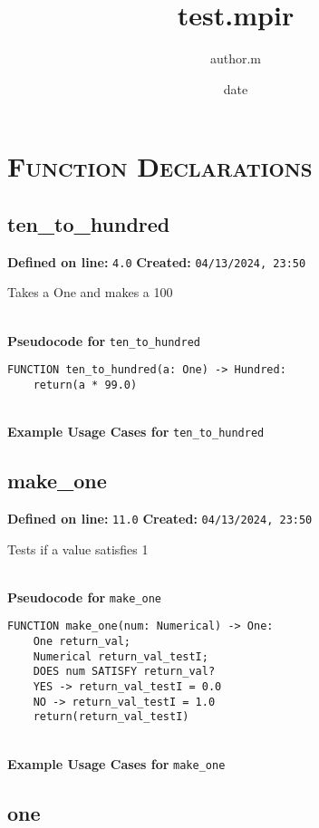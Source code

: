 \documentclass{article}
\title{test.mpir}
\author{author.m}
\date{date}
\begin{document}
\maketitle
\clearpage
\tableofcontents
\clearpage

\section{\textsc{Function Declarations}}

\subsection{ten\_to\_hundred}

\textbf{Defined on line:} \verb|4.0| \hfill \textbf{Created:} \verb|04/13/2024, 23:50| 


Takes a One and makes a 100

\textbf{\\ Pseudocode for } \texttt{ten\_to\_hundred}
\begin{verbatim}
FUNCTION ten_to_hundred(a: One) -> Hundred:
	return(a * 99.0)
\end{verbatim}

\textbf{\\ Example Usage Cases for } \texttt{ten\_to\_hundred}
\clearpage

\subsection{make\_one}

\textbf{Defined on line:} \verb|11.0| \hfill \textbf{Created:} \verb|04/13/2024, 23:50| 


Tests if a value satisfies 1

\textbf{\\ Pseudocode for } \texttt{make\_one}
\begin{verbatim}
FUNCTION make_one(num: Numerical) -> One:
	One return_val;
	Numerical return_val_testI;
	DOES num SATISFY return_val?
	YES -> return_val_testI = 0.0
	NO -> return_val_testI = 1.0
	return(return_val_testI)
\end{verbatim}

\textbf{\\ Example Usage Cases for } \texttt{make\_one}
\clearpage

\subsection{one}
\end{document}
